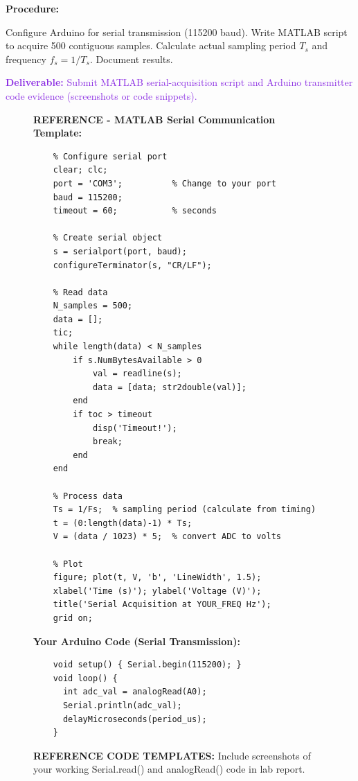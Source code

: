 \documentclass[11pt,letterpaper]{article}
\providecommand{\delECE}[1]{\textcolor{BlueViolet}{\textbf{Deliverable:} #1}}
\begin{document}
\textbf{Procedure:}

Configure Arduino for serial transmission (115200 baud). Write MATLAB script to acquire 500 contiguous samples. Calculate actual sampling period $T_s$ and frequency $f_s = 1/T_s$. Document results.

\delECE{Submit MATLAB serial-acquisition script and Arduino transmitter code evidence (screenshots or code snippets).}

\begin{figure}[H]
    \centering
    \vspace{0.5in}
    \textbf{REFERENCE - MATLAB Serial Communication Template:}
    
    \begin{verbatim}
    % Configure serial port
    clear; clc;
    port = 'COM3';          % Change to your port
    baud = 115200;
    timeout = 60;           % seconds
    
    % Create serial object
    s = serialport(port, baud);
    configureTerminator(s, "CR/LF");
    
    % Read data
    N_samples = 500;
    data = [];
    tic;
    while length(data) < N_samples
        if s.NumBytesAvailable > 0
            val = readline(s);
            data = [data; str2double(val)];
        end
        if toc > timeout
            disp('Timeout!');
            break;
        end
    end
    
    % Process data
    Ts = 1/Fs;  % sampling period (calculate from timing)
    t = (0:length(data)-1) * Ts;
    V = (data / 1023) * 5;  % convert ADC to volts
    
    % Plot
    figure; plot(t, V, 'b', 'LineWidth', 1.5);
    xlabel('Time (s)'); ylabel('Voltage (V)');
    title('Serial Acquisition at YOUR_FREQ Hz');
    grid on;
    \end{verbatim}
    
    \vspace{0.3in}
    \textbf{Your Arduino Code (Serial Transmission):}
    \begin{verbatim}
    void setup() { Serial.begin(115200); }
    void loop() {
      int adc_val = analogRead(A0);
      Serial.println(adc_val);
      delayMicroseconds(period_us);
    }
    \end{verbatim}
    
    \vspace{0.3in}
    \caption{\textbf{REFERENCE CODE TEMPLATES:} Include screenshots of your working Serial.read() and analogRead() code in lab report.}
    \label{fig:matlab_serial_code}
\end{figure}
\end{document}
